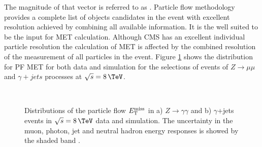 The magnitude of that vector is referred to as . Particle flow methodology provides a complete list of objects candidates in the event with excellent resolution achieved by combining all available information. It is the well suited to be the input for \gls{MET} calculation. Although \gls{CMS} has an excellent individual particle resolution the calculation of \gls{MET} is affected by the combined resolution of the measurement of all particles in the event. Figure \ref{FIGURE:EventReconstructionAndSimulation_METDistributionZmumu} shows the distribution for \gls{PF} \gls{MET} for both data and simulation for the selections of events of $Z \rightarrow \mu\mu$ and $\gamma +jets$ processes at $\sqrt{s}=8\,\TeV$. 

\begin{figure}[!htp]%
\centering
{}\qquad
{}\\
 \caption[Distributions of the particle flow $\MET$ in $Z\rightarrow\gamma\gamma$ and $\gamma$+jets events in $\sqrt{s}=8\,\TeV$ data and simulation.]{Distributions of the particle flow $\MET$ in a) $Z\rightarrow\gamma\gamma$ and b) $\gamma$+jets events in $\sqrt{s}=8\,\TeV$ data and simulation. The uncertainty in the muon, photon, jet and neutral hadron energy responses is showed by the shaded band \cite{ARTICLE:CMSMETPerformance8TeV}.}
\label{FIGURE:EventReconstructionAndSimulation_METDistributionZmumu}
\end{figure}

